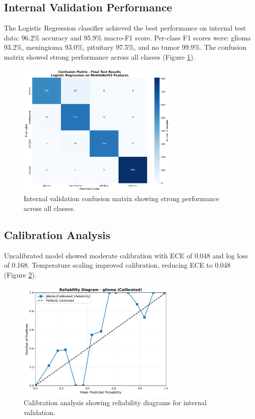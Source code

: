 \documentclass[11pt]{article}
\begin{document}
\subsection{Internal Validation Performance}

The Logistic Regression classifier achieved the best performance on internal test data: 96.2\% accuracy and 95.9\% macro-F1 score. Per-class F1 scores were: glioma 93.2\%, meningioma 93.0\%, pituitary 97.5\%, and no tumor 99.9\%. The confusion matrix showed strong performance across all classes (Figure \ref{fig:confusion_matrix}).

\begin{figure}[H]
\centering
\includegraphics[width=0.7\textwidth]{figs_paper/Figure1_Internal_Confusion_Matrix.png}
\caption{Internal validation confusion matrix showing strong performance across all classes.}
\label{fig:confusion_matrix}
\end{figure}

\subsection{Calibration Analysis}

Uncalibrated model showed moderate calibration with ECE of 0.048 and log loss of 0.168. Temperature scaling improved calibration, reducing ECE to 0.048 (Figure \ref{fig:calibration}).

\begin{figure}[H]
\centering
\includegraphics[width=0.7\textwidth]{figs_paper/Figure3_Internal_Calibration_Diagram.png}
\caption{Calibration analysis showing reliability diagrams for internal validation.}
\label{fig:calibration}
\end{figure}
\end{document}
